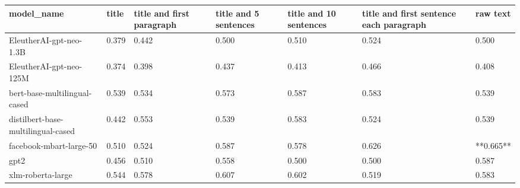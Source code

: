 \begin{tabular}{lllllll}
\toprule
                        model\_name & title & title and first paragraph & title and 5 sentences & title and 10 sentences & title and first sentence each paragraph &  raw text \\
\midrule
           EleutherAI-gpt-neo-1.3B & 0.379 &                     0.442 &                 0.500 &                  0.510 &                                   0.524 &     0.500 \\
           EleutherAI-gpt-neo-125M & 0.374 &                     0.398 &                 0.437 &                  0.413 &                                   0.466 &     0.408 \\
      bert-base-multilingual-cased & 0.539 &                     0.534 &                 0.573 &                  0.587 &                                   0.583 &     0.539 \\
distilbert-base-multilingual-cased & 0.442 &                     0.553 &                 0.539 &                  0.583 &                                   0.524 &     0.539 \\
           facebook-mbart-large-50 & 0.510 &                     0.524 &                 0.587 &                  0.578 &                                   0.626 & **0.665** \\
                              gpt2 & 0.456 &                     0.510 &                 0.558 &                  0.500 &                                   0.500 &     0.587 \\
                 xlm-roberta-large & 0.544 &                     0.578 &                 0.607 &                  0.602 &                                   0.519 &     0.583 \\
\bottomrule
\end{tabular}
